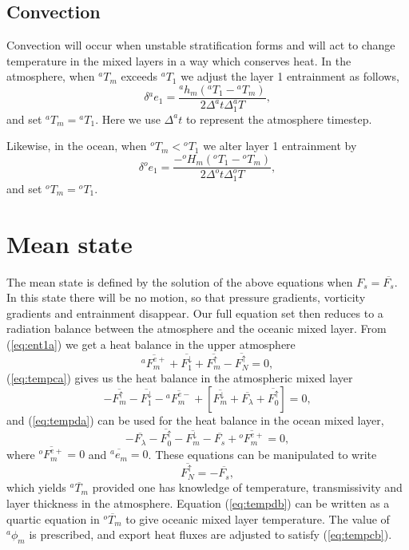 \documentclass[11pt, a4paper,twoside]{article}
\newcommand{\dt}[2]{\Delta_{#2}^{#1}T}
\newcommand{\HH}[2]{{{}^{#1}H_{#2}}}
\newcommand{\e}[2]{{{}^{#1}e_{#2}}}
\newcommand{\h}[2]{{{}^{#1}h_{#2}}}
\newcommand{\T}[2]{{{}^{#1}T_{#2}}}
\newcommand{\F}[3]{{{}^{#1}F^{#3}_{#2}}}
\newcommand{\Fup}[1]{{F^{\uparrow}_{#1}}}
\newcommand{\Fdown}[1]{{F^{\downarrow}_{#1}}}
\newcommand{\lb}[2]{{{}^{#1}\phi_{#2}}}
\numberwithin{equation}{section}
\begin{document}
\subsection{Convection}
Convection will occur when unstable stratification forms and will act to change temperature in the mixed layers in a way which conserves heat.
In the atmosphere, when $\T{a}{m}$ exceeds $\T{a}{1}$ we adjust the layer 1 entrainment as follows,
\begin{equation}\label{eq:atconv}
 \delta \e{a}{1}= \frac{\h{a}{m}(\T{a}{1} - \T{a}{m} )}{2 \Delta^at \dt{a}{1} },
\end{equation}
and set $\T{a}{m} = \T{a}{1}$.
Here we use $\Delta^at$ to represent the atmosphere timestep.

Likewise, in the ocean, when $\T{o}{m} < \T{o}{1}$ we alter layer 1 entrainment by
\begin{equation}\label{eq:occonv}
\delta \e{o}{1}= \frac{ - \HH{o}{m}(\T{o}{1} - \T{o}{m} )}{2 \Delta^ot \dt{o}{1}},
\end{equation}
and set  $\T{o}{m} = \T{o}{1}$.

\section{Mean state}\label{sec:mean}
The mean state is defined by the solution of the above equations when $F_s = \overline{F_s}$.
In this state there will be no motion, so that pressure gradients, vorticity gradients and entrainment disappear.
Our full equation set then reduces to a radiation balance between the atmosphere and the oceanic mixed layer.
From (\ref{eq:ent1a}) we get a heat balance in the upper atmosphere
\begin{equation}\label{eq:ent1b}
\overline{\F{a}{m}{e+}} + \overline{\Fdown{1}} + \overline{\Fup{m}} - \overline{\Fup{N}}=0,
\end{equation}
(\ref{eq:tempca}) gives us the heat balance in the atmospheric mixed layer
\begin{equation}\label{eq:tempcb}
-  \overline{\Fup{m}} - \overline{\Fdown{1}} - \overline{\F{a}{m}{e-}} + [ \overline{\Fdown{m}} + \overline{F_{\lambda}} + \overline{\Fup{0}}]=0,
\end{equation}
and (\ref{eq:tempda}) can be used for the heat balance in the ocean mixed layer,
\begin{equation}\label{eq:tempdb}
- \overline{F_{\lambda}} - \overline{\Fup{0}} - \overline{\Fdown{m}} - \overline{F_s} +  \overline{\F{o}{m}{e+}}= 0,
\end{equation}
where $\overline{\F{o}{m}{e+}}=0$ and $\overline{\e{a}{m}} = 0$.
These equations can be manipulated to write
\begin{equation}\overline{\Fup{N}} =  - \overline{F_s},\end{equation}
which yields $\overline{\T{a}{m}}$ provided one has knowledge of temperature, transmissivity and layer thickness in the atmosphere.
Equation (\ref{eq:tempdb}) can be written as a quartic equation in $\overline{\T{o}{m}}$ to give oceanic mixed layer temperature.
The value of $\lb{a}{m}$ is prescribed, and export heat fluxes are adjusted to satisfy (\ref{eq:tempcb}).
\end{document}
